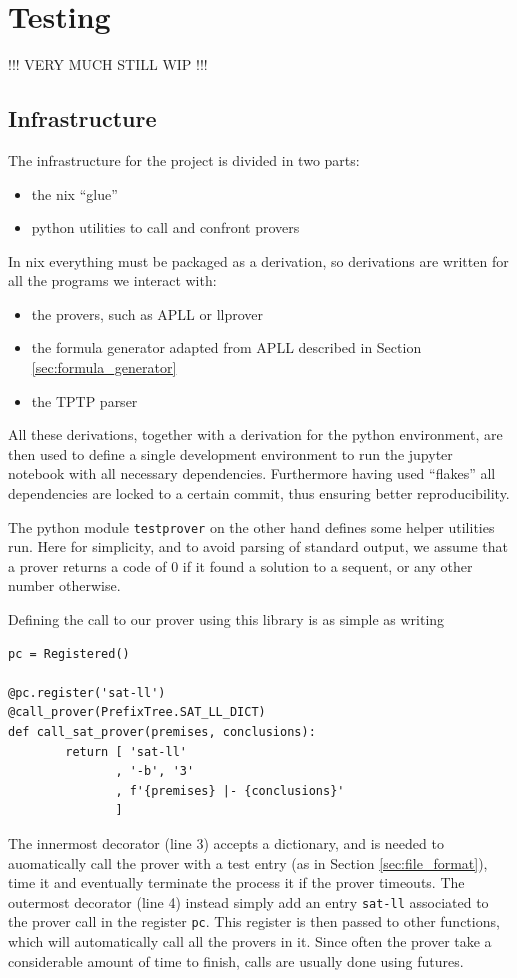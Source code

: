 \documentclass[a4paper, 12pt, tesi, english]{report}
\begin{document}
\chapter{Testing}
!!! VERY MUCH STILL WIP !!!
\section{Infrastructure}
The infrastructure for the project is divided in two parts:
\begin{itemize}
	\item the nix ``glue''
	\item python utilities to call and confront provers
\end{itemize}
In nix everything must be packaged as a derivation, so derivations are written for all the programs we interact with:
\begin{itemize}
	\item the provers, such as APLL or llprover
	\item the formula generator adapted from APLL described in Section \ref{sec:formula_generator}
	\item the TPTP parser
\end{itemize}
All these derivations, together with a derivation for the python environment, are then used to define a single development environment to run the jupyter notebook with all necessary dependencies.
Furthermore having used ``flakes'' all dependencies are locked to a certain commit, thus ensuring better reproducibility.

The python module \texttt{testprover} on the other hand defines some helper utilities run.
Here for simplicity, and to avoid parsing of standard output, we assume that a prover returns a code of 0 if it found a solution to a sequent, or any other number otherwise.

Defining the call to our prover using this library is as simple as writing
\begin{verbatim}
pc = Registered()

@pc.register('sat-ll')
@call_prover(PrefixTree.SAT_LL_DICT)
def call_sat_prover(premises, conclusions):
        return [ 'sat-ll'
               , '-b', '3'
               , f'{premises} |- {conclusions}'
               ]
\end{verbatim}
The innermost decorator (line 3) accepts a dictionary, and is needed to auomatically call the prover with a test entry (as in Section \ref{sec:file_format}), time it and eventually terminate the process it if the prover timeouts.
The outermost decorator (line 4) instead simply add an entry \texttt{sat-ll} associated to the prover call in the register \texttt{pc}.
This register is then passed to other functions, which will automatically call all the provers in it.
Since often the prover take a considerable amount of time to finish, calls are usually done using futures.
\end{document}
